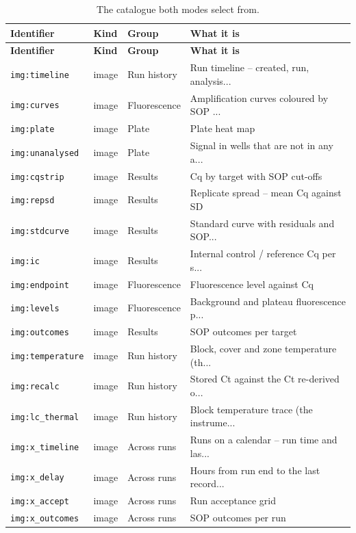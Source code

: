 {\small
\begin{xltabular}{\linewidth}{|X|X|X|X|}
\caption{The catalogue both modes select from.}\label{tab:catalogue} \\
\toprule \textbf{Identifier} & \textbf{Kind} & \textbf{Group} & \textbf{What it is} \\\midrule\endfirsthead
\toprule \textbf{Identifier} & \textbf{Kind} & \textbf{Group} & \textbf{What it is} \\\midrule\endhead
\texttt{img:timeline} & image & Run history & Run timeline -- created, run, analysis... \\
\texttt{img:curves} & image & Fluorescence & Amplification curves coloured by SOP ... \\
\texttt{img:plate} & image & Plate & Plate heat map \\
\texttt{img:unanalysed} & image & Plate & Signal in wells that are not in any a... \\
\texttt{img:cqstrip} & image & Results & Cq by target with SOP cut-offs \\
\texttt{img:repsd} & image & Results & Replicate spread -- mean Cq against SD \\
\texttt{img:stdcurve} & image & Results & Standard curve with residuals and SOP... \\
\texttt{img:ic} & image & Results & Internal control / reference Cq per s... \\
\texttt{img:endpoint} & image & Fluorescence & Fluorescence level against Cq \\
\texttt{img:levels} & image & Fluorescence & Background and plateau fluorescence p... \\
\texttt{img:outcomes} & image & Results & SOP outcomes per target \\
\texttt{img:temperature} & image & Run history & Block, cover and zone temperature (th... \\
\texttt{img:recalc} & image & Run history & Stored Ct against the Ct re-derived o... \\
\texttt{img:lc\_thermal} & image & Run history & Block temperature trace (the instrume... \\
\texttt{img:x\_timeline} & image & Across runs & Runs on a calendar -- run time and las... \\
\texttt{img:x\_delay} & image & Across runs & Hours from run end to the last record... \\
\texttt{img:x\_accept} & image & Across runs & Run acceptance grid \\
\texttt{img:x\_outcomes} & image & Across runs & SOP outcomes per run \\

\end{xltabular}}
